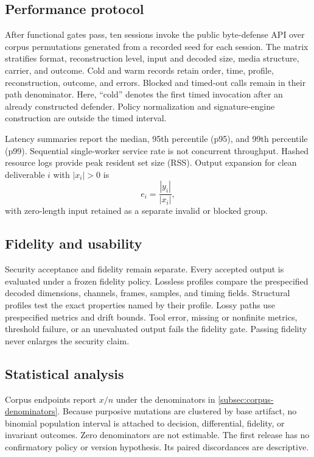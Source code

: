 \subsection{Performance protocol}
\label{subsec:performance-protocol}

After functional gates pass, ten sessions invoke the public byte-defense API
over corpus permutations generated from a recorded seed for each session. The matrix stratifies
format, reconstruction level, input and decoded size, media structure, carrier,
and outcome. Cold and warm records retain order, time, profile,
reconstruction, outcome, and errors. Blocked and timed-out calls remain in
their path denominator. Here, ``cold'' denotes the first timed invocation after
an already constructed defender. Policy normalization and signature-engine
construction are outside the timed interval.

Latency summaries report the median, 95th percentile (p95), and 99th percentile
(p99). Sequential single-worker service rate is not concurrent throughput.
Hashed resource logs provide peak resident set size (RSS). Output expansion for
clean deliverable \(i\) with \(|x_i|>0\) is
\begin{equation}
 e_i=\frac{|y_i|}{|x_i|},
 \label{eq:expansion}
\end{equation}
with zero-length input retained as a separate invalid or blocked group.

\subsection{Fidelity and usability}
\label{subsec:fidelity-protocol}

Security acceptance and fidelity remain separate. Every accepted output is
evaluated under a frozen fidelity policy. Lossless profiles compare the
prespecified decoded dimensions, channels, frames, samples, and timing fields.
Structural profiles test the exact properties named by their profile. Lossy
paths use prespecified metrics and drift bounds. Tool error, missing or nonfinite
metrics, threshold failure, or an unevaluated output fails the fidelity gate.
Passing fidelity never enlarges the security claim.

\subsection{Statistical analysis}
\label{subsec:statistical-analysis}

Corpus endpoints report \(x/n\) under the denominators in
\cref{subsec:corpus-denominators}. Because purposive mutations are clustered by
base artifact, no binomial population interval is attached to decision,
differential, fidelity, or invariant outcomes. Zero denominators are not
estimable. The first release has no confirmatory policy or version hypothesis.
Its paired discordances are descriptive.

